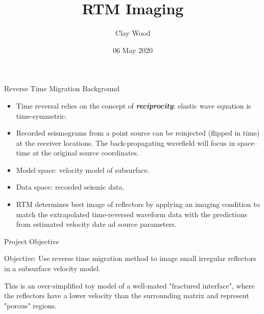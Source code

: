 \documentclass[aspectratio=169]{beamer}
\title{RTM Imaging}
\author{Clay Wood}
\date{06 May 2020}
\begin{document}
	
	
\begin{frame}[plain]
    \maketitle
\end{frame}


\begin{frame}{Reverse Time Migration Background}
	\begin{itemize}
		\item Time reversal relies on the concept of \textbf{\textit{reciprocity}}: elastic wave equation is time-symmetric.
		\item Recorded seismograms from a point source can be reinjected (flipped in time) at the receiver locations. The back-propagating wavefield will focus in space–time at the original source coordinates.
		\item Model space: velocity model of subsurface.
		\item Data space: recorded seismic data.
		\item RTM determines best image of reflectors by applying an imaging condition to match the extrapolated time-reversed waveform data with the predictions from estimated velocity date ad source parameters.
	\end{itemize}

%	
\end{frame}


\begin{frame}{Project Objective}
	
	\begin{block}{Objective: }
		Use reverse time migration method to image small irregular reflectors in a subsurface velocity model. 
	\end{block}

	
	This is an over-simplified toy model of a well-mated "fractured interface", where the reflectors have a lower velocity than the surrounding matrix and represent "porous" regions.
	

%	
\end{frame}
\end{document}
